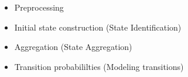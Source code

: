 \begin{itemize}
	\item Preprocessing
	\item Initial state construction (State Identification)
	\item Aggregation (State Aggregation)
	\item Transition probabililties (Modeling transitions)
\end{itemize}